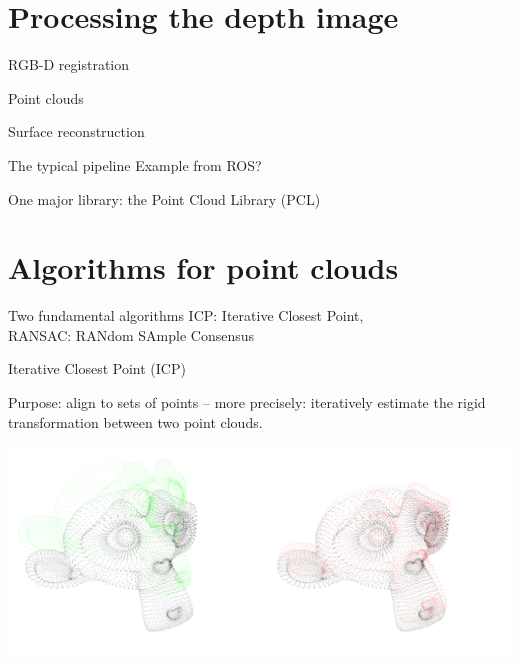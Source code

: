 \documentclass[compress]{beamer}
\begin{document}

\section{Processing the depth image}

\begin{frame}{RGB-D registration}
\end{frame}

\begin{frame}{Point clouds}
\end{frame}

\begin{frame}{Surface reconstruction}
\end{frame}

\begin{frame}{The typical pipeline}
    Example from ROS?

    One major library: the Point Cloud Library (PCL)
\end{frame}



\section{Algorithms for point clouds}

\begin{frame}{Two fundamental algorithms}
\centering
{\Medium ICP}: Iterative Closest Point, \\
{\Medium RANSAC}: RANdom SAmple Consensus 
\end{frame}


\begin{frame}{Iterative Closest Point (ICP)}

    Purpose: align to sets of points -- more precisely: {\Medium iteratively}
    estimate the {\Medium rigid transformation} between two point clouds.

    \begin{center}
        \includegraphics[width=\linewidth]{icp}
    \end{center}
\end{frame}
\end{document}
